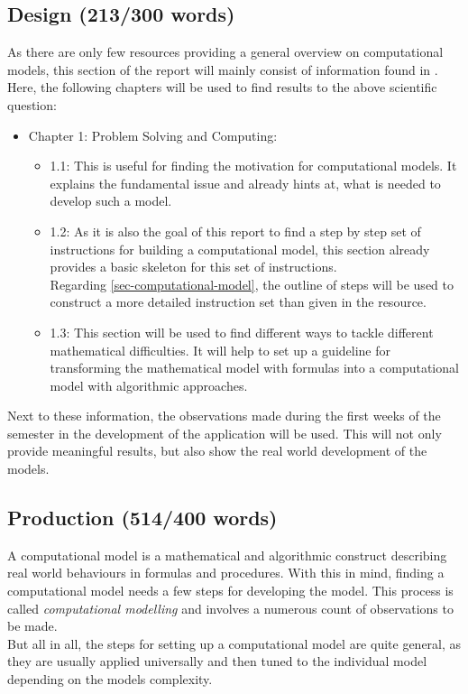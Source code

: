 \documentclass[conference,compsoc]{IEEEtran}
\begin{document}
\subsection{Design (213/300 words)}
As there are only few resources providing a general overview on computational models, this section of the report will mainly consist of information found in \cite{ComputationalModelsIntroduction}.\\
Here, the following chapters will be used to find results to the above scientific question:
\begin{itemize}
	\item Chapter 1: Problem Solving and Computing:
	\begin{itemize}
		\item 1.1: This is useful for finding the motivation for computational models. It explains the fundamental issue and already hints at, what is needed to develop such a model.
		\item 1.2: As it is also the goal of this report to find a step by step set of instructions for building a computational model, this section already provides a basic skeleton for this set of instructions. \\
		Regarding \ref{sec-computational-model}, the outline of steps will be used to construct a more detailed instruction set than given in the resource. 
		\item 1.3: This section will be used to find different ways to tackle different mathematical difficulties. It will help to set up a guideline for transforming the mathematical model with formulas into a computational model with algorithmic approaches. 
	\end{itemize}
	
\end{itemize}
Next to these information, the observations made during the first weeks of the semester in the development of the application will be used. This will not only provide meaningful results, but also show the real world development of the models.
\subsection{Production (514/400 words)}
A computational model is a mathematical and algorithmic construct describing real world behaviours in formulas and procedures. With this in mind, finding a computational model needs a few steps for developing the model. This process is called \emph{computational modelling} and involves a numerous count of observations to be made. \\
But all in all, the steps for setting up a computational model are quite general, as they are usually applied universally and then tuned to the individual model depending on the models complexity.
\end{document}

